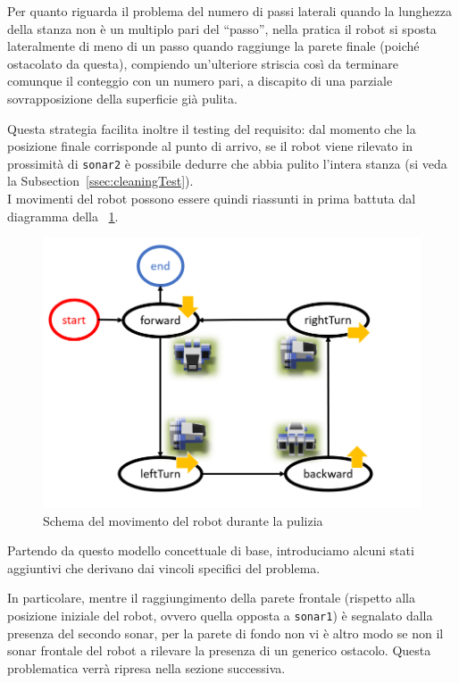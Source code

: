 \documentclass{../llncs}
\newcommand{\code}[1]{{\color{blue}\small{\texttt{#1}}}}
\newcommand{\xss}[1]{\subsectionname~\ref{ssec:#1}}
\newcommand{\labelfig}[1]{\label{fig:#1}}
\newcommand{\xf}[1]{\figurename~\ref{fig:#1}}
\newcommand{\subsectionname}{Subsection}
\begin{document}
Per quanto riguarda il problema del numero di passi laterali quando la lunghezza della stanza non è un multiplo pari del ``passo'', nella pratica il robot si sposta lateralmente di meno di un passo quando raggiunge la parete finale (poiché ostacolato da questa), compiendo un'ulteriore striscia così da terminare comunque il conteggio con un numero pari, a discapito di una parziale sovrapposizione della superficie già pulita.

Questa strategia facilita inoltre il testing del requisito: dal momento che la posizione finale corrisponde al punto di arrivo, se il robot viene rilevato in prossimità di \code{sonar2} è possibile dedurre che abbia pulito l'intera stanza (si veda la \xss{cleaningTest}).\\

I movimenti del robot possono essere quindi riassunti in prima battuta dal diagramma della \xf{floorCleanDraft}.

\begin{figure}[!htb]
\centering
\includegraphics[scale=0.45]{img/stateDiagramCleaningDraft.png}
\caption{Schema del movimento del robot durante la pulizia}\labelfig{floorCleanDraft}
\end{figure}

Partendo da questo modello concettuale di base, introduciamo alcuni stati aggiuntivi che derivano dai vincoli specifici del problema.

In particolare, mentre il raggiungimento della parete frontale (rispetto alla posizione iniziale del robot, ovvero quella opposta a \code{sonar1}) è segnalato dalla presenza del secondo sonar, per la parete di fondo non vi è altro modo se non il sonar frontale del robot a rilevare la presenza di un generico ostacolo. Questa problematica verrà ripresa nella sezione successiva.
\end{document}

